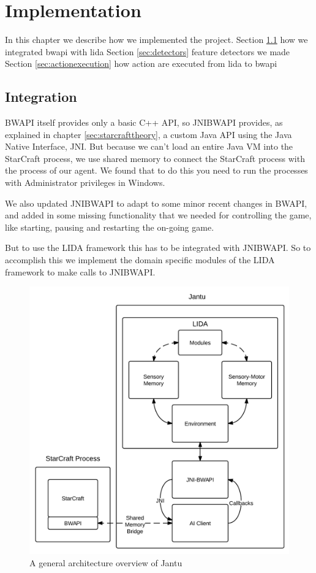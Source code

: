 
\chapter{Implementation}
In this chapter we describe how we implemented the project.
Section \ref{sec:integration} how we integrated bwapi with lida
Section \ref{sec:detectors} feature detectors we made
Section \ref{sec:actionexecution} how action are executed from lida to bwapi



\section{Integration}
\label{sec:integration}
BWAPI itself provides only a basic C++ API, so JNIBWAPI provides, as explained in chapter \ref{sec:starcrafttheory}, a custom Java API using the Java Native Interface, JNI.\cite{jni} But because we can't load an entire Java VM into the StarCraft process, we use shared memory to connect the StarCraft process with the process of our agent. We found that to do this you need to run the processes with Administrator privileges in Windows.

We also updated JNIBWAPI to adapt to some minor recent changes in BWAPI, and added in some missing functionality that we needed for controlling the game, like starting, pausing and restarting the on-going game.

But to use the LIDA framework this has to be integrated with JNIBWAPI. So to accomplish this we implement the domain specific modules of the LIDA framework to make calls to JNIBWAPI. 


\begin{figure}[h!tb]
\centering
\includegraphics[scale=1.0]{graphics/jantu.png}
\caption{A general architecture overview of Jantu}
\label{fig:jantu}
\end{figure}

